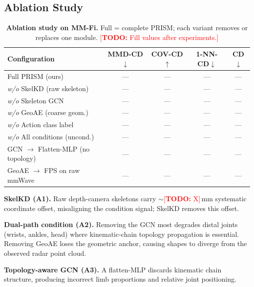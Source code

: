 \documentclass{article}
\newcommand{\todo}[1]{\textcolor{red}{[\textbf{TODO:} #1]}}
\begin{document}
\subsection{Ablation Study}
\label{sec:ablation}

\begin{table}[t]
  \centering
  \caption{
    \textbf{Ablation study on MM-Fi.}
    Full = complete PRISM; each variant removes or replaces one module.
    \todo{Fill values after experiments.}
  }
  \label{tab:ablation}
  \small
  \setlength{\tabcolsep}{5pt}
  \begin{tabular}{lcccc}
    \toprule
    Configuration
      & MMD-CD$\downarrow$ & COV-CD$\uparrow$
      & 1-NN-CD$\downarrow$ & CD$\downarrow$ \\
    \midrule
    \rowcolor{green!8}
    Full PRISM (ours)                       & ---  & ---  & ---  & ---  \\
    \midrule
    \emph{w/o} SkelKD (raw skeleton)          & ---  & ---  & ---  & ---  \\
    \emph{w/o} Skeleton GCN                   & ---  & ---  & ---  & ---  \\
    \emph{w/o} GeoAE (coarse geom.)  & ---  & ---  & ---  & ---  \\
    \emph{w/o} Action class label             & ---  & ---  & ---  & ---  \\
    \emph{w/o} All conditions (uncond.)       & ---  & ---  & ---  & ---  \\
    GCN $\to$ Flatten-MLP (no topology)       & ---  & ---  & ---  & ---  \\
    GeoAE $\to$ FPS on raw mmWave       & ---  & ---  & ---  & ---  \\
    \bottomrule
  \end{tabular}
\end{table}

\textbf{SkelKD (A1).}
Raw depth-camera skeletons carry $\sim$\todo{X}\,mm systematic coordinate offset,
misaligning the condition signal; SkelKD removes this offset.

\textbf{Dual-path condition (A2).}
Removing the GCN most degrades distal joints (wrists, ankles, head) where
kinematic-chain topology propagation is essential.
Removing GeoAE loses the geometric anchor, causing shapes to diverge
from the observed radar point cloud.

\textbf{Topology-aware GCN (A3).}
A flatten-MLP discards kinematic chain structure, producing incorrect limb
proportions and relative joint positioning.
\end{document}
